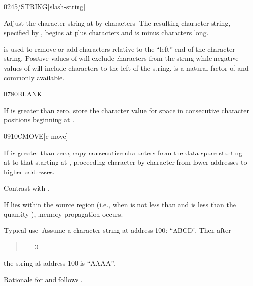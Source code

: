 \begin{worddef}{0245}{/STRING}[slash-string]
\item {}

	Adjust the character string at  by 
	characters. The resulting character string, specified by
	, begins at  plus 
	characters and is  minus  characters long.

	\begin{rationale} %
		 is used to remove or add characters relative
		to the ``left'' end of the character string. Positive values
		of  will exclude characters from the string while
		negative values of  will include characters to the
		left of the string.  is a natural factor of
		 and commonly available.
	\end{rationale}
\end{worddef}


\begin{worddef}{0780}{BLANK}
\item {}

	If  is greater than zero, store the character value for
	space in  consecutive character positions beginning at
	.
\end{worddef}


\begin{worddef}{0910}{CMOVE}[c-move]
\item {}

	If  is greater than zero, copy  consecutive
	characters from the data space starting at  to
	that starting at , proceeding character-by-character
	from lower addresses to higher addresses.

\item[Contrast with]
	.

	\begin{rationale} %
		If  lies within the source region (i.e., when
		 is not less than  and
		 is less than the quantity 
		 \word[core]{+}), memory propagation occurs.

		Typical use: Assume a character string at address
		100: ``ABCD''. Then after
		\begin{quote}  ~  ~ 3 
		\end{quote}
		the string at address 100 is ``AAAA''.

		Rationale for  and  follows
		.
	\end{rationale}
\end{worddef}


